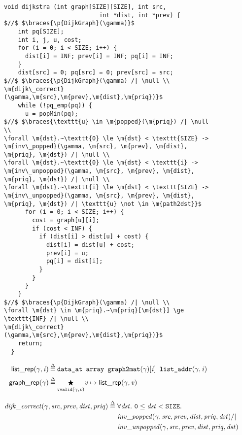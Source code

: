 
\begin{figure}
\begin{lstlisting}[mathescape=true]
  void dijkstra (int graph[SIZE][SIZE], int src, 
                           int *dist, int *prev) {
$//$ $\braces{\p{DijkGraph}(\gamma)}$
    int pq[SIZE];
    int i, j, u, cost;
    for (i = 0; i < SIZE; i++) {
      dist[i] = INF; prev[i] = INF; pq[i] = INF;
    }
    dist[src] = 0; pq[src] = 0; prev[src] = src;
$//$ $\braces{\p{DijkGraph}(\gamma) /| \null \\
\m{dijk\_correct}(\gamma,\m{src},\m{prev},\m{dist},\m{priq})}$
    while (!pq_emp(pq)) {
      u = popMin(pq);
$//$ $\braces{\texttt{u} \in \m{popped}(\m{priq}) /| \null \\
\forall \m{dst}.~\texttt{0} \le \m{dst} < \texttt{SIZE} -> \m{inv\_popped}(\gamma, \m{src}, \m{prev}, \m{dist}, \m{priq}, \m{dst}) /| \null \\
\forall \m{dst}.~\texttt{0} \le \m{dst} < \texttt{i} -> \m{inv\_unpopped}(\gamma, \m{src}, \m{prev}, \m{dist}, \m{priq}, \m{dst}) /| \null \\
\forall \m{dst}.~\texttt{i} \le \m{dst} < \texttt{SIZE} -> \m{inv\_unpopped}(\gamma, \m{src}, \m{prev}, \m{dist}, \m{priq}, \m{dst}) /| \texttt{u} \not \in \m{path2dst}}$
      for (i = 0; i < SIZE; i++) {
        cost = graph[u][i]; 
        if (cost < INF) {
          if (dist[i] > dist[u] + cost) {
            dist[i] = dist[u] + cost;
            prev[i] = u; 
            pq[i] = dist[i];
          }
        }  
      }
    }
$//$ $\braces{\p{DijkGraph}(\gamma) /| \null \\ 
\forall \m{dst} \in \m{priq}.~\m{priq}[\m{dst}] \ge \texttt{INF} /| \null \\ 
\m{dijk\_correct}(\gamma,\m{src},\m{prev},\m{dist},\m{priq})}$
    return;
  }
\end{lstlisting}
\vspace{0.5em}
\begin{equation*}
\begin{split}
\p{list\_rep}(\gamma, \m{i}) &\defeq \texttt{data\_at  array  graph2mat}(\gamma)[\m{i}] \texttt{  list\_addr}(\gamma, \m{i}) \\
\vspace{1em}
\p{graph\_rep}(\gamma) &\defeq \underset{\texttt{vvalid}(\gamma,\m{v})}{\bigstar} \m{v}  \mapsto\p{list\_rep}(\gamma, \m{v})
\end{split}
\end{equation*}

\begin{equation*}
\begin{split}
\m{dijk\_correct}(\gamma, \m{src}, \m{prev}, \m{dist}, \m{priq}) \; \defeq \; &\forall \m{dst}.~\texttt{0} \le \m{dst} < \texttt{SIZE}. \\
&\m{inv\_popped}(\gamma, \m{src}, \m{prev}, \m{dist}, \m{priq}, \m{dst}) /| \null \\
&\m{inv\_unpopped}(\gamma, \m{src}, \m{prev}, \m{dist}, \m{priq}, \m{dst})
\end{split}
\end{equation*}


\end{figure}
